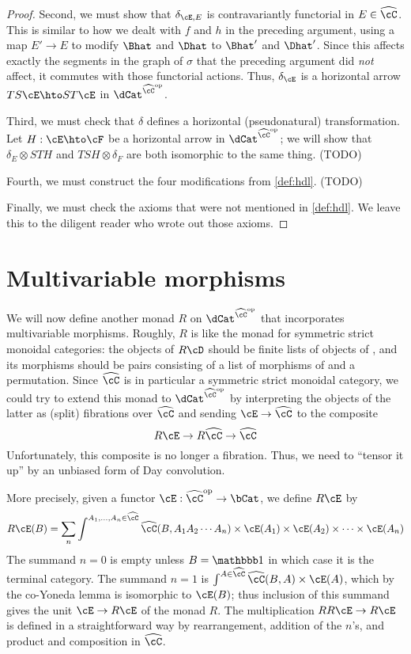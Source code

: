 \documentclass{amsart}
\newcommand{\C}{\cC}
\renewcommand{\Chat}{\ensuremath{\widehat{\C}}\xspace}
\newcommand{\E}{\cE}
\newcommand{\F}{\cF}
\newcommand{\one}{\lone}
\begin{document}
\begin{proof}
  Second, we must show that $\delta_{\E,E}$ is contravariantly functorial in $E\in\Chat$.
  This is similar to how we dealt with $f$ and $h$ in the preceding argument, using a map $E'\to E$ to modify $\Bhat$ and $\Dhat$ to $\Bhat'$ and $\Dhat'$.
  Since this affects exactly the segments in the graph of $\sigma$ that the preceding argument did \emph{not} affect, it commutes with those functorial actions.
  Thus, $\delta_\E$ is a horizontal arrow $TS\E \hto ST\E$ in $\dCat^{\Chat\op}$.

  Third, we must check that $\delta$ defines a horizontal (pseudonatural) transformation.
  Let $H:\E\hto \F$ be a horizontal arrow in $\dCat^{\Chat\op}$; we will show that $\delta_E \otimes STH$ and $TSH\otimes \delta_F$ are both isomorphic to the same thing.
  (TODO)

  Fourth, we must construct the four modifications from \cref{def:hdl}.
  (TODO)

  Finally, we must check the axioms that were not mentioned in \cref{def:hdl}.
  We leave this to the diligent reader who wrote out those axioms.
\end{proof}

\section{Multivariable morphisms}
\label{sec:multivar}

We will now define another monad $R$ on $\dCat^{\Chat\op}$ that incorporates multivariable morphisms.
Roughly, $R$ is like the monad for symmetric strict monoidal categories: the objects of $R\cD$ should be finite lists of objects of \cD, and its morphisms should be pairs consisting of a list of morphisms of \cD and a permutation.
Since \Chat is in particular a symmetric strict monoidal category, we could try to extend this monad to $\dCat^{\Chat\op}$ by interpreting the objects of the latter as (split) fibrations over $\Chat$ and sending $\E\to \Chat$ to the composite
\[ R\E \to R\Chat \to \Chat \]
Unfortunately, this composite is no longer a fibration.
Thus, we need to ``tensor it up'' by an unbiased form of Day convolution.

More precisely, given a functor $\E:\Chat\op\to \bCat$, we define $R\E$ by
\[ R\E(B) = \sum_n \int^{A_1,\dots,A_n\in\Chat} \Chat(B,A_1 A_2\cdots A_n) \times \E(A_1)\times \E(A_2)\times \cdots\times \E(A_n) \]
The summand $n=0$ is empty unless $B=\one$ in which case it is the terminal category.
The summand $n=1$ is $\int^{A\in\Chat} \Chat(B,A) \times \E(A)$, which by the co-Yoneda lemma is isomorphic to $\E(B)$; thus inclusion of this summand gives the unit $\E\to R\E$ of the monad $R$.
The multiplication $RR\E\to R\E$ is defined in a straightforward way by rearrangement, addition of the $n$'s, and product and composition in $\Chat$.
\end{document}
